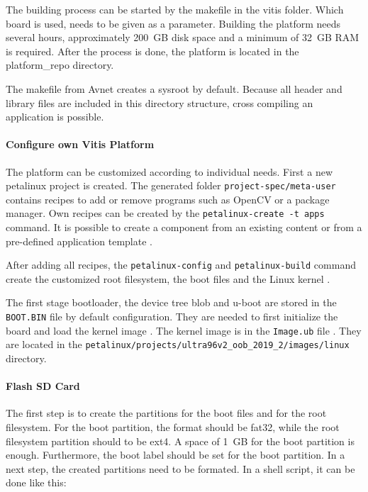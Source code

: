 The building process can be started by the makefile in the vitis folder.
Which board is used, needs to be given as a parameter.
Building the platform needs several hours, approximately \SI{200}{GB} disk space and a minimum of \SI{32}{GB} RAM is required.
After the process is done, the platform is located in the platform\_repo directory.

The makefile from Avnet creates a sysroot by default.
Because all header and library files are included in this directory structure, cross compiling an application is possible.

\paragraph{Configure own Vitis Platform}
The platform can be customized according to individual needs.
First a new petalinux project is created.
The generated folder \texttt{project-spec/meta-user} contains recipes to add or remove programs such as OpenCV or a package manager.
Own recipes can be created by the \texttt{petalinux-create -t apps} command.
It is possible to create a component from an existing content or from a pre-defined application template \cite{petalinux_commandline_guide}.

After adding all recipes, the \texttt{petalinux-config} and \texttt{petalinux-build} command create the customized root filesystem, the boot files and the Linux kernel \cite{petalinux_user_guide}.

The first stage bootloader, the device tree blob and u-boot are stored in the \texttt{BOOT.BIN} file by default configuration.
They are needed to first initialize the board and load the kernel image \cite{xilinx_wiki_boot}.
The kernel image is in the \texttt{Image.ub} file \cite{xilinx_wiki_uboot}.
They are located in the \texttt{petalinux/projects/ultra96v2\_oob\_2019\_2/images/linux} directory.

\paragraph{Flash SD Card}
The first step is to create the partitions for the boot files and for the root filesystem.
For the boot partition, the format should be fat32, while the root filesystem partition should to be ext4.
A space of \SI{1}{GB} for the boot partition is enough.
Furthermore, the boot label should be set for the boot partition.
In a next step, the created partitions need to be formated.
In a shell script, it can be done like this:

